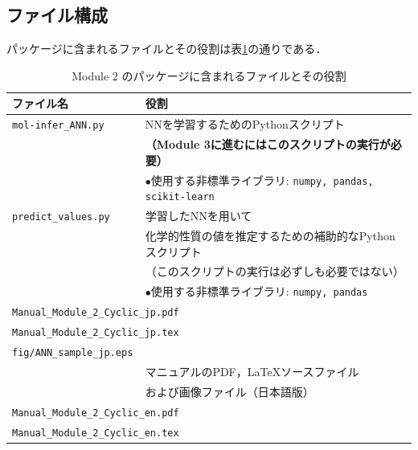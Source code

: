 \documentclass[11pt, titlepage, dvipdfmx, twoside]{jarticle}
\newcommand{\tabref}[1]{表\ref{tab:#1}}
\begin{document}
\subsection{ファイル構成}
パッケージに含まれるファイルとその役割は\tabref{files}の通りである．
\begin{table}[h!]
  \centering
  \caption{Module 2 のパッケージに含まれるファイルとその役割}
  \label{tab:files}
  \begin{tabular}{lcll}
  \hline
  \bf ファイル名 &\ \ & \multicolumn{2}{l}{\bf 役割}\\
  \hline
  \verb|mol-infer_ANN.py| && \multicolumn{2}{l}{NNを学習するためのPythonスクリプト}\\
  &&\multicolumn{2}{l}{\bf （Module 3に進むにはこのスクリプトの実行が必要）}\\
  &&\multicolumn{2}{l}{$\bullet$使用する非標準ライブラリ: {\tt numpy, pandas, scikit-learn}}\\
  \hline
  \verb|predict_values.py| && \multicolumn{2}{l}{学習したNNを用いて}\\
  &&\multicolumn{2}{l}{化学的性質の値を推定するための補助的なPythonスクリプト}\\
  &&\multicolumn{2}{l}{（このスクリプトの実行は必ずしも必要ではない）}\\
  &&\multicolumn{2}{l}{$\bullet$使用する非標準ライブラリ: {\tt numpy, pandas}}\\
  \hline
  \multicolumn{4}{l}{\tt Manual\_Module\_2\_Cyclic\_jp.pdf}\\
  \multicolumn{4}{l}{\tt Manual\_Module\_2\_Cyclic\_jp.tex}\\
  \multicolumn{4}{l}{\tt fig/ANN\_sample\_jp.eps}\\
  &&\multicolumn{2}{l}{マニュアルのPDF，\LaTeX ソースファイル}\\
  &&\multicolumn{2}{l}{および画像ファイル（日本語版）}\\
  \hline
  \multicolumn{4}{l}{\tt Manual\_Module\_2\_Cyclic\_en.pdf}\\
  \multicolumn{4}{l}{\tt Manual\_Module\_2\_Cyclic\_en.tex}\\

\end{tabular}
\end{table}
\end{document}
